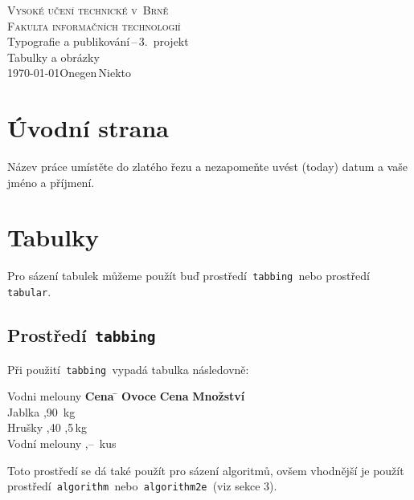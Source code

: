 \documentclass[a4paper, 11pt]{article}
\begin{document}
\begin{titlepage}
	\begin{center}
		{\Huge \textsc{Vysoké učení technické v~Brně}\\}
		{\huge \textsc{Fakulta informačních technologií}\\}
		{\LARGE Typografie a publikování\,--\,3.\ projekt\\}
		{\Huge Tabulky a obrázky\\}
		{\Large \today \hfill Onegen\,Niekto}
	\end{center}
\end{titlepage}

\section{Úvodní strana}

Název práce umístěte do zlatého řezu a nezapomeňte uvést  (today)
datum a vaše jméno a příjmení.

\section{Tabulky}

Pro sázení tabulek m\r{u}žeme použít buď prostředí\texttt{ tabbing }nebo
prostředí\texttt{ tabular}.

\subsection{Prostředí\texttt{ tabbing}}

Při použití\texttt{ tabbing }vypadá tabulka následovně:
%
\begin{tabbing}
	Vodni melouny \quad  \= \textbf{Cena} \quad \=                \kill
	\textbf{Ovoce}       \> \textbf{Cena}       \> \textbf{Množství} \\
	Jablka               ,90               \,kg             \\
	Hrušky               ,40               ,5\,kg           \\
	Vodní melouny        ,--               \,kus            \\
\end{tabbing}

\noindent
Toto prostředí se dá také použít pro sázení algoritm\r{u}, ovšem vhodnější je
použít prostředí\texttt{ algorithm }nebo\texttt{ algorithm2e }(viz sekce
3).
\end{document}
